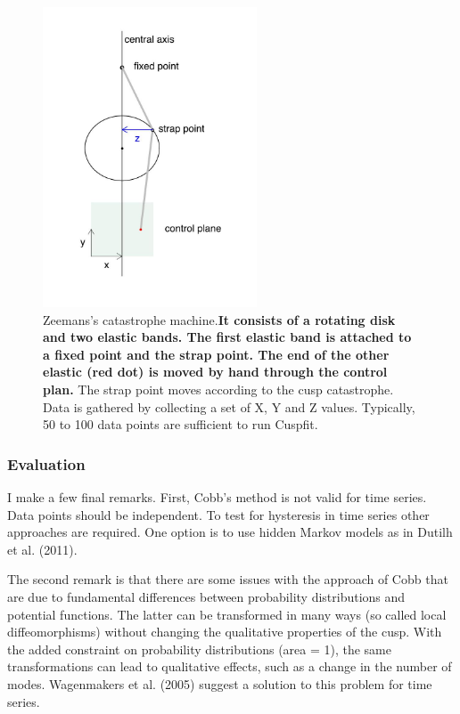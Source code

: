 \documentclass[
  letterpaper,
]{scrbook}
\begin{document}
\begin{figure}

{\centering \includegraphics[width=2.49785in,height=3.51107in]{media/ch3/image26.jpg}

}

\caption{\label{fig-ch3-img26-old-38}Zeemans's catastrophe
machine.\textbf{It consists of a rotating disk and two elastic bands.
The first elastic band is attached to a fixed point and the strap point.
The end of the other elastic (red dot) is moved by hand through the
control plan.} The strap point moves according to the cusp catastrophe.
Data is gathered by collecting a set of X, Y and Z values. Typically, 50
to 100 data points are sufficient to run Cuspfit.}

\end{figure}

\hypertarget{evaluation}{%
\subsubsection{Evaluation}\label{evaluation}}

I make a few final remarks. First, Cobb's method is not valid for time
series. Data points should be independent. To test for hysteresis in
time series other approaches are required. One option is to use hidden
Markov models as in Dutilh et al. (2011).

The second remark is that there are some issues with the approach of
Cobb that are due to fundamental differences between probability
distributions and potential functions. The latter can be transformed in
many ways (so called local diffeomorphisms) without changing the
qualitative properties of the cusp. With the added constraint on
probability distributions (area = 1), the same transformations can lead
to qualitative effects, such as a change in the number of modes.
Wagenmakers et al. (2005) suggest a solution to this problem for time
series.
\end{document}
